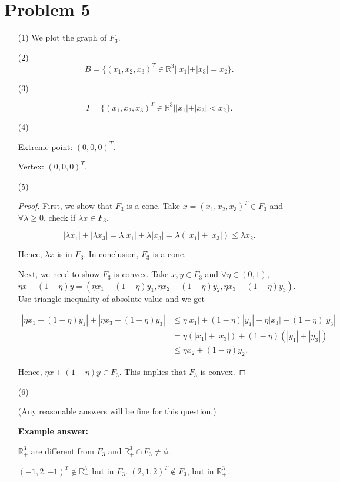 \documentclass[12pt]{article}
\begin{document}
\section*{Problem 5}

\begin{enumerate}
\item [(1)]
We plot the graph of $F_3$.


\item [(2)]
$$
B = \{(x_1, x_2, x_3)^T \in \mathbb R^3 | |x_1| + |x_3| = x_2 \}.
$$



\item [(3)]

$$
I = \{(x_1, x_2, x_3)^T \in \mathbb R^3 | |x_1| + |x_3| < x_2 \}.
$$


\item [(4)]

Extreme point: $(0, 0, 0)^T$.

Vertex: $(0, 0, 0)^T$.

\item [(5)]
\begin{proof}

First, we show that $F_3$ is a cone. Take $x = (x_1, x_2, x_3)^T \in F_3$ and $\forall \lambda \geqslant 0$, check if $\lambda x \in F_3$. 

$$
|\lambda x_1| + |\lambda x_3| = \lambda |x_1| + \lambda |x_3| = \lambda (|x_1| + |x_3|) \leqslant \lambda x_2.
$$

Hence, $\lambda x$ is in $F_3$. In conclusion, $F_3$ is a cone.

Next, we need to show $F_3$ is convex. Take $x, y \in F_3$ and $\forall \eta \in (0, 1)$, $\eta x + (1- \eta) y = (\eta x_1 + (1-\eta)y_1, \eta x_2 + (1-\eta)y_2, \eta x_3 + (1-\eta)y_3)$. Use triangle inequality of absolute value and we get

$$
\begin{aligned}
|\eta x_1 + (1-\eta)y_1| + |\eta x_3 + (1-\eta)y_3| & \leqslant \eta |x_1| + (1-\eta)|y_1| + \eta |x_3| + (1-\eta)|y_3| \\
& = \eta (|x_1|+|x_3|) + (1-\eta)(|y_1|+|y_3|) \\
& \leqslant \eta x_2 + (1-\eta) y_2.
\end{aligned}
$$

Hence, $\eta x + (1- \eta) y \in F_3$. This implies that $F_3$ is convex.

\end{proof}

\item [(6)]

(Any reasonable answers will be fine for this question.)

\textbf{Example answer:}

$\mathbb R_+^3$ are different from $F_3$ and $\mathbb R_+^3 \cap F_3 \neq \phi$. 

$(-1, 2, -1)^T \notin \mathbb R_+^3$ but in $F_3$. $(2,1,2)^T \notin F_3$, but in $\mathbb R_+^3$.

\end{enumerate}
\end{document}
